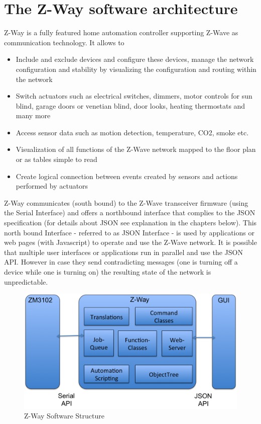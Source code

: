   
\section{The Z-Way software architecture}

Z-Way is a fully featured home automation controller supporting Z-Wave as communication technology. It allows to
\begin{itemize}
\item Include and exclude devices and configure these devices, manage the network configuration and stability by visualizing 
the configuration and routing within the network
\item Switch actuators such as electrical switches, dimmers, motor controls for sun blind, garage doors or venetian blind, door 
looks, heating thermostats and many more
\item Access sensor data such as motion detection, temperature, CO2, smoke etc.
\item Visualization of all functions of the Z-Wave network mapped to the floor plan or as tables simple to read
\item Create logical connection between events created by sensors and actions performed by actuators
\end{itemize}

Z-Way communicates (south bound) to the Z-Wave transceiver firmware (using the Serial Interface) and offers a 
northbound interface that complies to the JSON specification (for details about JSON see explanation in the chapters below).
This north bound Interface - referred to as JSON Interface - is used by applications or web pages (with Javascript)
 to operate and use the Z-Wave network. It is possible that multiple user interfaces or applications run in parallel and use the JSON 
 API. However in  case they send contradicting messages (one is turning off a device while one is turning on) the resulting
 state of the network is unpredictable. 

\begin{figure} 
\begin{center}
\includegraphics[scale=0.6]{pics/zway1en.png}
\caption{Z-Way Software Structure}
\label{zwaystructure} 
\end{center} 
\end{figure}

